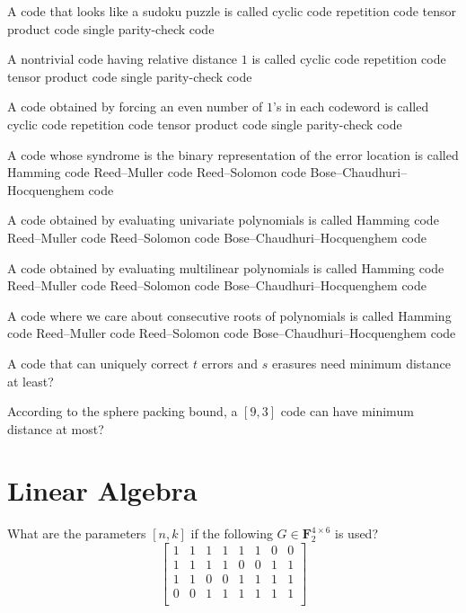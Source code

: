 \documentclass[a4paper]{article}
\def\FF{\mathbf F}
\begin{document}
\Problem{4em}
A code that looks like a sudoku puzzle is called
\no cyclic code
\no repetition code
\yes tensor product code
\no single parity-check code

\Problem{4em}
A nontrivial code having relative distance $1$ is called
\no cyclic code
\yes repetition code
\no tensor product code
\no single parity-check code

\Problem{4em}
A code obtained by forcing an even number of $1$'s in each codeword is called
\no cyclic code
\no repetition code
\no tensor product code
\yes single parity-check code

\Problem{4em}
A code whose syndrome is the binary representation
of the error location is called
\yes Hamming code
\no Reed--Muller code
\no Reed--Solomon code
\no Bose--Chaudhuri--Hocquenghem code

\Problem{4em}
A code obtained by evaluating univariate polynomials is called
\no Hamming code
\no Reed--Muller code
\yes Reed--Solomon code
\no Bose--Chaudhuri--Hocquenghem code

\Problem{4em}
A code obtained by evaluating multilinear polynomials is called
\no Hamming code
\yes Reed--Muller code
\no Reed--Solomon code
\no Bose--Chaudhuri--Hocquenghem code

\Problem{4em}
A code where we care about consecutive roots of polynomials is called
\no Hamming code
\yes Reed--Muller code
\no Reed--Solomon code
\no Bose--Chaudhuri--Hocquenghem code

\Problem{6em}
A code that can uniquely correct $t$ errors and $s$ erasures
need minimum distance at least?

\Problem{4em}
According to the sphere packing bound,
a $[9, 3]$ code can have minimum distance at most?

\section{Linear Algebra}

\Problem{4em}
What are the parameters $[n, k]$
if the following $G \in \FF_2^{4\times6}$ is used?
\[
    \begin{bmatrix}
        1 & 1 & 1 & 1 & 1 & 1 & 0 & 0 \\
        1 & 1 & 1 & 1 & 0 & 0 & 1 & 1 \\
        1 & 1 & 0 & 0 & 1 & 1 & 1 & 1 \\
        0 & 0 & 1 & 1 & 1 & 1 & 1 & 1 \\
    \end{bmatrix}
\]
\end{document}

